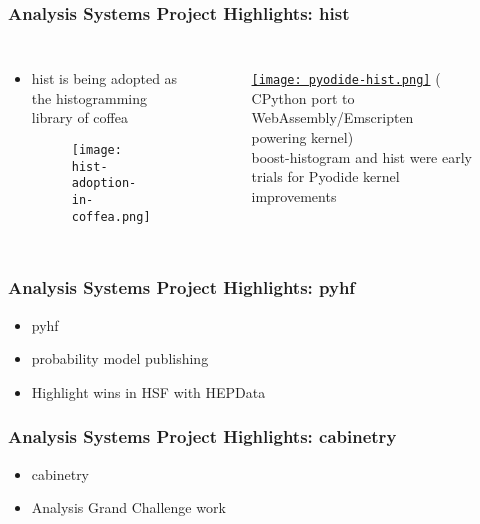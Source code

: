 \begin{frame}
  \frametitle{Analysis Systems Project Highlights: hist}

  \begin{columns}
    \begin{itemize}\setlength{\itemsep}{0.1 cm}
      \item hist is being adopted as the histogramming library of coffea
      \begin{figure}
        \begin{center}
          \texttt{[image: hist-adoption-in-coffea.png]}
        \end{center}
      \end{figure}
    \end{itemize}
%
    \begin{figure}
        \begin{center}
            \href{https://github.com/jpivarski-talks/2022-07-11-scipy-loopy-tutorial}{\texttt{[image: pyodide-hist.png]}}
            {\tiny ( CPython port to WebAssembly/Emscripten powering  kernel)}\\boost-histogram and hist were early trials for Pyodide kernel improvements
        \end{center}
    \end{figure}
  \end{columns}

\end{frame}

\begin{frame}
  \frametitle{Analysis Systems Project Highlights: pyhf}

  \begin{itemize}
    \item pyhf
    \item probability model publishing
    \item Highlight wins in HSF with HEPData
  \end{itemize}

\end{frame}

\begin{frame}
  \frametitle{Analysis Systems Project Highlights: cabinetry}

  \begin{itemize}
    \item cabinetry
    \item Analysis Grand Challenge work
  \end{itemize}

\end{frame}

